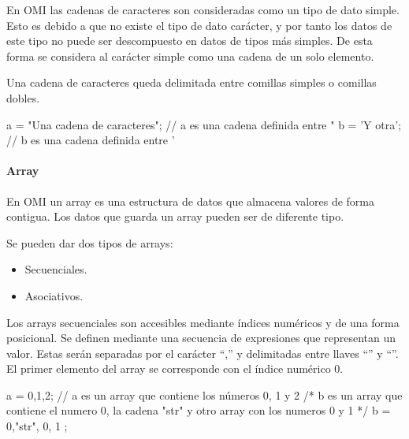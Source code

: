 En OMI las cadenas de caracteres son consideradas como un tipo de dato simple. Esto es debido a que no existe el tipo de dato carácter, y por tanto los datos de este tipo no puede ser 
descompuesto en datos de tipos más simples. De esta forma se considera al carácter simple como una cadena de un solo elemento.

Una cadena de caracteres queda delimitada entre comillas simples o comillas dobles. \\

\begin{myverbatim}
   a = "Una cadena de caracteres"; // a es una cadena definida entre "
   b = 'Y otra'; // b es una cadena definida entre '
\end{myverbatim}


\paragraph{Array}\label{sec:type_array}

En OMI un array es una estructura de datos que almacena valores de forma contigua. Los datos que guarda un array pueden ser de diferente tipo. 

Se pueden dar dos tipos de arrays:

\begin{itemize}
\item Secuenciales.
\item Asociativos.
\end{itemize}

Los arrays secuenciales son accesibles mediante índices numéricos y de una forma posicional. Se definen mediante una secuencia de expresiones que representan 
un valor. Estas serán separadas por el carácter ``,'' y delimitadas entre llaves ``{'' y ``}''. El primer elemento del array se corresponde con el índice numérico $0$. \\

 \begin{myverbatim}
   a = {0,1,2}; // a es un array que contiene los números 0, 1 y 2
   /* 
      b es un array que contiene el numero 0, la
      cadena "str" y otro array con los numeros 0 y 1
   */
   b = {0,"str", { 0, 1 } }; 
\end{myverbatim}

